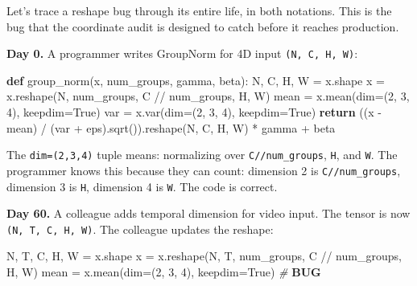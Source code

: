 \documentclass[11pt,titlepage]{article}
\newenvironment{Shaded}{}{}
\newcommand{\AlertTok}[1]{\textcolor[rgb]{1.00,0.00,0.00}{\textbf{#1}}}
\newcommand{\CommentTok}[1]{\textcolor[rgb]{0.38,0.63,0.69}{\textit{#1}}}
\newcommand{\ControlFlowTok}[1]{\textcolor[rgb]{0.00,0.44,0.13}{\textbf{#1}}}
\newcommand{\DecValTok}[1]{\textcolor[rgb]{0.25,0.63,0.44}{#1}}
\newcommand{\KeywordTok}[1]{\textcolor[rgb]{0.00,0.44,0.13}{\textbf{#1}}}
\newcommand{\NormalTok}[1]{#1}
\newcommand{\OperatorTok}[1]{\textcolor[rgb]{0.40,0.40,0.40}{#1}}
\newcommand{\VariableTok}[1]{\textcolor[rgb]{0.10,0.09,0.49}{#1}}
\begin{document}
Let's trace a reshape bug through its entire life, in both notations.
This is the bug that the coordinate audit is designed to catch before it
reaches production.

\textbf{Day 0.} A programmer writes GroupNorm for 4D input
\texttt{(N,\ C,\ H,\ W)}:

\begin{Shaded}
\begin{Highlighting}[]
\KeywordTok{def}\NormalTok{ group_norm(x, num_groups, gamma, beta):}
\NormalTok{    N, C, H, W }\OperatorTok{=}\NormalTok{ x.shape}
\NormalTok{    x }\OperatorTok{=}\NormalTok{ x.reshape(N, num_groups, C }\OperatorTok{//}\NormalTok{ num_groups, H, W)}
\NormalTok{    mean }\OperatorTok{=}\NormalTok{ x.mean(dim}\OperatorTok{=}\NormalTok{(}\DecValTok{2}\NormalTok{, }\DecValTok{3}\NormalTok{, }\DecValTok{4}\NormalTok{), keepdim}\OperatorTok{=}\VariableTok{True}\NormalTok{)}
\NormalTok{    var }\OperatorTok{=}\NormalTok{ x.var(dim}\OperatorTok{=}\NormalTok{(}\DecValTok{2}\NormalTok{, }\DecValTok{3}\NormalTok{, }\DecValTok{4}\NormalTok{), keepdim}\OperatorTok{=}\VariableTok{True}\NormalTok{)}
    \ControlFlowTok{return}\NormalTok{ ((x }\OperatorTok{-}\NormalTok{ mean) }\OperatorTok{/}\NormalTok{ (var }\OperatorTok{+}\NormalTok{ eps).sqrt()).reshape(N, C, H, W) }\OperatorTok{*}\NormalTok{ gamma }\OperatorTok{+}\NormalTok{ beta}
\end{Highlighting}
\end{Shaded}

The \texttt{dim=(2,3,4)} tuple means: normalizing over
\texttt{C//num\_groups}, \texttt{H}, and \texttt{W}. The programmer
knows this because they can count: dimension 2 is
\texttt{C//num\_groups}, dimension 3 is \texttt{H}, dimension 4 is
\texttt{W}. The code is correct.

\textbf{Day 60.} A colleague adds temporal dimension for video input.
The tensor is now \texttt{(N,\ T,\ C,\ H,\ W)}. The colleague updates
the reshape:

\begin{Shaded}
\begin{Highlighting}[]
\NormalTok{N, T, C, H, W }\OperatorTok{=}\NormalTok{ x.shape}
\NormalTok{x }\OperatorTok{=}\NormalTok{ x.reshape(N, T, num_groups, C }\OperatorTok{//}\NormalTok{ num_groups, H, W)}
\NormalTok{mean }\OperatorTok{=}\NormalTok{ x.mean(dim}\OperatorTok{=}\NormalTok{(}\DecValTok{2}\NormalTok{, }\DecValTok{3}\NormalTok{, }\DecValTok{4}\NormalTok{), keepdim}\OperatorTok{=}\VariableTok{True}\NormalTok{)  }\CommentTok{# }\AlertTok{BUG}
\end{Highlighting}
\end{Shaded}
\end{document}
